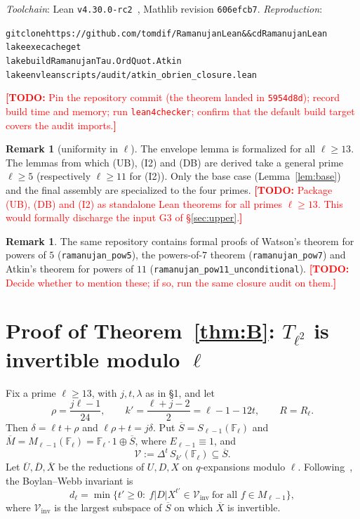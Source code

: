 \documentclass[11pt]{amsart}
\newcommand{\Fl}{\mathbb{F}_\ell}
\newcommand{\Sb}{\overline{S}}
\newcommand{\Mb}{\overline{M}}
\newcommand{\Ub}{\overline{U}}
\newcommand{\Db}{\overline{D}}
\newcommand{\Xb}{\overline{X}}
\newcommand{\cV}{\mathcal{V}}
\newcommand{\TODO}[1]{\textcolor{red}{\textbf{[TODO:} #1\textbf{]}}}
\newcommand{\lean}[1]{\texttt{#1}}
\theoremstyle{plain}
\theoremstyle{definition}
\newtheorem{remark}[theorem]{Remark}
\numberwithin{equation}{section}
\begin{document}
\emph{Toolchain}: Lean \lean{v4.30.0-rc2}~\cite{Lean4}, Mathlib revision \lean{606efcb7}.
\emph{Reproduction}:
\begin{alltt}\small
git clone https://github.com/tomdif/RamanujanLean && cd RamanujanLean
lake exe cache get
lake build RamanujanTau.OrdQuot.Atkin
lake env lean scripts/audit/atkin_obrien_closure.lean
\end{alltt}
\TODO{Pin the repository commit (the theorem landed in \lean{5954d8d}); record build time and memory; run
\lean{lean4checker}; confirm that the default build target covers the audit imports.}

\begin{remark}[uniformity in $\ell$]
The envelope lemma is formalized for all $\ell\ge13$. The lemmas from which (UB), (I2) and (DB) are derived take a general
prime $\ell\ge5$ (respectively $\ell\ge11$ for (I2)). Only the base case (Lemma~\ref{lem:base}) and the final assembly are
specialized to the four primes. \TODO{Package (UB), (DB) and (I2) as standalone Lean theorems for all primes
$\ell\ge 13$. This would formally discharge the input G3 of \S\ref{sec:upper}.}
\end{remark}

\begin{remark}
The same repository contains formal proofs of Watson's theorem for powers of $5$ (\lean{ramanujan\_pow5}), the powers-of-$7$
theorem (\lean{ramanujan\_pow7}) and Atkin's theorem for powers of $11$ (\lean{ramanujan\_pow11\_unconditional}).
\TODO{Decide whether to mention these; if so, run the same closure audit on them.}
\end{remark}

\section{Proof of Theorem~\ref{thm:B}: $T_{\ell^2}$ is invertible modulo $\ell$}\label{sec:thmB}

Fix a prime $\ell\ge13$, with $j,t,\lambda$ as in \S1, and let
\[
  \rho=\frac{j\ell-1}{24},\qquad k'=\frac{\ell+j-2}{2}=\ell-1-12t,\qquad R=R_\ell .
\]
Then $\delta=\ell t+\rho$ and $\ell\rho+t=j\delta$. Put $\Sb=S_{\ell-1}(\Fl)$ and $\Mb=M_{\ell-1}(\Fl)=\Fl\cdot1\oplus\Sb$,
where $E_{\ell-1}\equiv1$, and
\[
  \cV:=\Delta^t\,S_{k'}(\Fl)\subseteq\Sb .
\]
Let $\Ub,\Db,\Xb$ be the reductions of $U,D,X$ on $q$-expansions modulo $\ell$. Following~\cite[(5.1)]{BoylanWebb2013}, the
Boylan--Webb invariant is
\begin{equation}\label{eq:dl}
  d_\ell=\min\{t'\ge0:\ f|D|X^{t'}\in\cV_{\mathrm{inv}}\ \text{for all } f\in M_{\ell-1}\},
\end{equation}
where $\cV_{\mathrm{inv}}$ is the largest subspace of $\Sb$ on which $\Xb$ is invertible.
\end{document}
